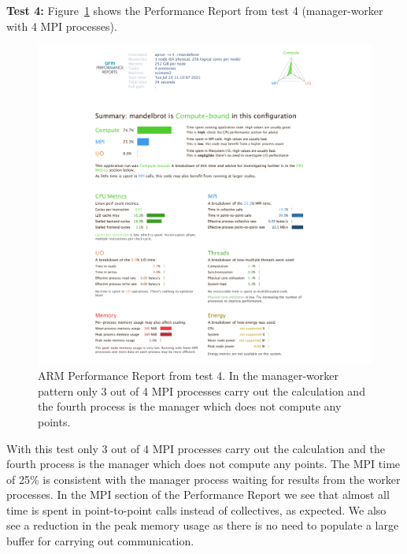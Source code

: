 \documentclass[a4paper,titlepage]{article}
\begin{document}
\noindent
\textbf{Test 4:} Figure~\ref{fig:perf-report_MB3} shows the Performance Report from test 4 (manager-worker with 4 MPI processes).
\begin{figure}[htbp]
\begin{center}
\includegraphics[scale=0.35]{figures/mandelbrot_v3_PerformanceReport}
\caption{ARM Performance Report from test 4. In the manager-worker pattern only 3 out of 4 MPI processes carry out the calculation and the fourth process is the manager which does not compute any points.}
\label{fig:perf-report_MB3}
\end{center}
\end{figure}
With this test only 3 out of 4 MPI processes carry out the calculation and the fourth process is the manager which does not compute any points. The MPI time of 25\% is consistent with the manager process waiting for results from the worker processes. In the MPI section of the Performance Report we see that almost all time is spent in point-to-point calls instead of collectives, as expected. We also see a reduction in the peak memory usage as there is no need to populate a large buffer for carrying out communication. \\
\end{document}
